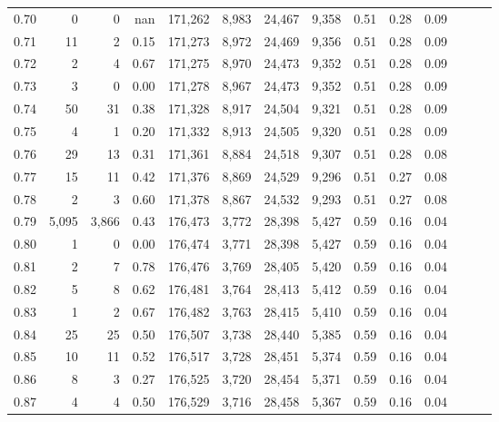 \begin{tabular}{rrrrrrrrrrrrrr}
0.70 &       0 &      0 &   nan &  171,262 &    8,983 &  24,467 &   9,358 &  0.51 &  0.28 &      0.09 \\
0.71 &      11 &      2 &  0.15 &  171,273 &    8,972 &  24,469 &   9,356 &  0.51 &  0.28 &      0.09 \\
0.72 &       2 &      4 &  0.67 &  171,275 &    8,970 &  24,473 &   9,352 &  0.51 &  0.28 &      0.09 \\
0.73 &       3 &      0 &  0.00 &  171,278 &    8,967 &  24,473 &   9,352 &  0.51 &  0.28 &      0.09 \\
0.74 &      50 &     31 &  0.38 &  171,328 &    8,917 &  24,504 &   9,321 &  0.51 &  0.28 &      0.09 \\
0.75 &       4 &      1 &  0.20 &  171,332 &    8,913 &  24,505 &   9,320 &  0.51 &  0.28 &      0.09 \\
0.76 &      29 &     13 &  0.31 &  171,361 &    8,884 &  24,518 &   9,307 &  0.51 &  0.28 &      0.08 \\
0.77 &      15 &     11 &  0.42 &  171,376 &    8,869 &  24,529 &   9,296 &  0.51 &  0.27 &      0.08 \\
0.78 &       2 &      3 &  0.60 &  171,378 &    8,867 &  24,532 &   9,293 &  0.51 &  0.27 &      0.08 \\
0.79 &   5,095 &  3,866 &  0.43 &  176,473 &    3,772 &  28,398 &   5,427 &  0.59 &  0.16 &      0.04 \\
0.80 &       1 &      0 &  0.00 &  176,474 &    3,771 &  28,398 &   5,427 &  0.59 &  0.16 &      0.04 \\
0.81 &       2 &      7 &  0.78 &  176,476 &    3,769 &  28,405 &   5,420 &  0.59 &  0.16 &      0.04 \\
0.82 &       5 &      8 &  0.62 &  176,481 &    3,764 &  28,413 &   5,412 &  0.59 &  0.16 &      0.04 \\
0.83 &       1 &      2 &  0.67 &  176,482 &    3,763 &  28,415 &   5,410 &  0.59 &  0.16 &      0.04 \\
0.84 &      25 &     25 &  0.50 &  176,507 &    3,738 &  28,440 &   5,385 &  0.59 &  0.16 &      0.04 \\
0.85 &      10 &     11 &  0.52 &  176,517 &    3,728 &  28,451 &   5,374 &  0.59 &  0.16 &      0.04 \\
0.86 &       8 &      3 &  0.27 &  176,525 &    3,720 &  28,454 &   5,371 &  0.59 &  0.16 &      0.04 \\
0.87 &       4 &      4 &  0.50 &  176,529 &    3,716 &  28,458 &   5,367 &  0.59 &  0.16 &      0.04 \\

\end{tabular}
